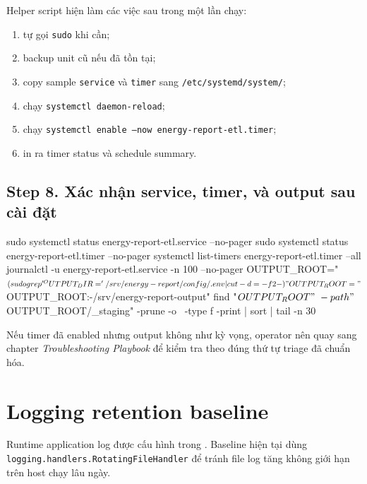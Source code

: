 Helper script hiện làm các việc sau trong một lần chạy:

\begin{enumerate}[label=-]
\item tự gọi \texttt{sudo} khi cần;
\item backup unit cũ nếu đã tồn tại;
\item copy sample \texttt{service} và \texttt{timer} sang \texttt{/etc/systemd/system/};
\item chạy \texttt{systemctl daemon-reload};
\item chạy \texttt{systemctl enable --now energy-report-etl.timer};
\item in ra timer status và schedule summary.
\end{enumerate}

\subsection{Step 8. Xác nhận service, timer, và output sau cài đặt}

\begin{ShellBlock}
sudo systemctl status energy-report-etl.service --no-pager
sudo systemctl status energy-report-etl.timer --no-pager
systemctl list-timers energy-report-etl.timer --all
journalctl -u energy-report-etl.service -n 100 --no-pager
OUTPUT_ROOT="$(sudo grep '^OUTPUT_DIR=' /srv/energy-report/config/.env | cut -d= -f2-)"
OUTPUT_ROOT="${OUTPUT_ROOT:-/srv/energy-report-output}"
find "$OUTPUT_ROOT" \
  -path "$OUTPUT_ROOT/_staging" -prune -o \
  -type f -print | sort | tail -n 30
\end{ShellBlock}

Nếu timer đã enabled nhưng output không như kỳ vọng, operator nên quay sang chapter \textit{Troubleshooting Playbook} để kiểm tra theo đúng thứ tự triage đã chuẩn hóa.

\section{Logging retention baseline}

Runtime application log được cấu hình trong . Baseline hiện tại dùng \texttt{logging.handlers.RotatingFileHandler} để tránh file log tăng không giới hạn trên host chạy lâu ngày.

